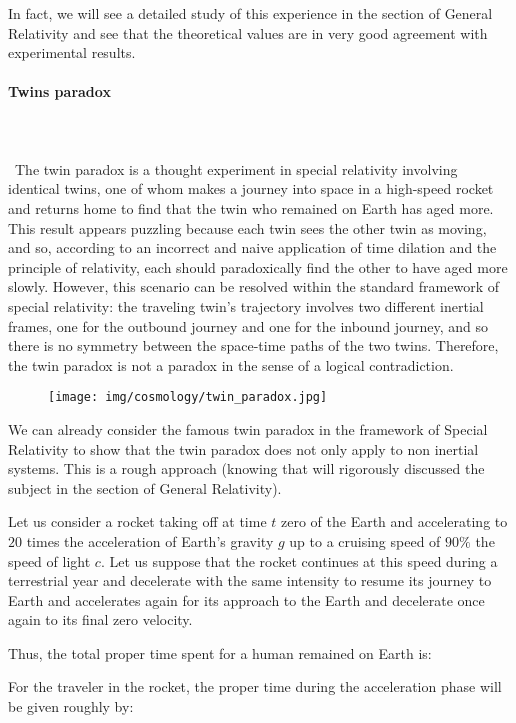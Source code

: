 	In fact, we will see a detailed study of this experience in the section of General Relativity and see that the theoretical values are in very good agreement with experimental results.
	
	\paragraph{Twins paradox}\mbox{}\\\\\
	The twin paradox is a thought experiment in special relativity involving identical twins, one of whom makes a journey into space in a high-speed rocket and returns home to find that the twin who remained on Earth has aged more. This result appears puzzling because each twin sees the other twin as moving, and so, according to an incorrect and naive application of time dilation and the principle of relativity, each should paradoxically find the other to have aged more slowly. However, this scenario can be resolved within the standard framework of special relativity: the traveling twin's trajectory involves two different inertial frames, one for the outbound journey and one for the inbound journey, and so there is no symmetry between the space-time paths of the two twins. Therefore, the twin paradox is not a paradox in the sense of a logical contradiction.
	\begin{figure}[H]
		\begin{center}
		\texttt{[image: img/cosmology/twin\_paradox.jpg]}
		\end{center}
	\end{figure}
	We can already consider the famous twin paradox in the framework of Special Relativity to show that the twin paradox does not only apply to non inertial systems. This is a rough approach (knowing that will rigorously discussed the subject in the section of General Relativity).

	Let us consider a rocket taking off at time $t$ zero of the Earth and accelerating to $20$ times the acceleration of Earth's gravity $g$ up to a cruising speed of $90\%$ the speed of light $c$. Let us suppose that the rocket continues at this speed during a terrestrial year and decelerate with the same intensity to resume its journey to Earth and accelerates again for its approach to the Earth and decelerate once again to its final zero velocity.
	
	
	Thus, the total proper time spent for a human remained on Earth is:
	
	For the traveler in the rocket, the proper time during the acceleration phase will be given roughly by:
	
